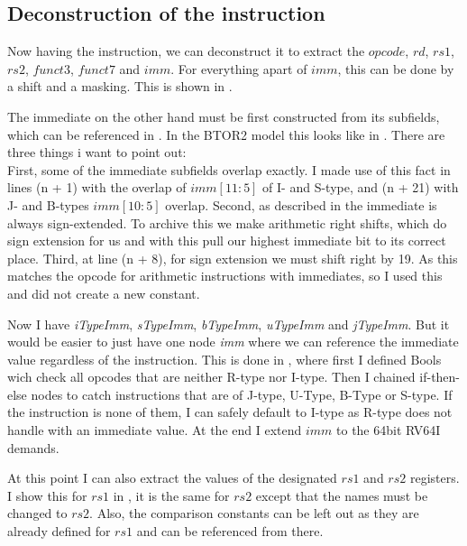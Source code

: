 \subsection{Deconstruction of the instruction}
Now having the instruction, we can deconstruct it to extract the
$opcode$, $rd$, $rs1$, $rs2$, $funct3$, $funct7$ and $imm$. For
everything apart of $imm$, this can be done by a shift and a masking.
This is shown in .

The immediate on the other hand must be first constructed from its
subfields, which can be referenced in . In
the BTOR2 model this looks like in .
 There are three things i
want to point out:\\ First, some of the immediate subfields overlap
exactly. I made use of this fact in lines (n + 1) with the overlap of
$imm[11:5]$ of I- and S-type, and (n + 21) with J- and B-types
$imm[10:5]$ overlap. Second, as described in 
the immediate is always sign-extended. To archive this we make
arithmetic right shifts, which do sign extension for us and with this
pull our highest immediate bit to its correct place. Third, at line
(n + 8), for sign extension we must shift right by 19. As this
matches the opcode for arithmetic instructions with immediates, so I
used this and did not create a new constant.

Now I have \textsl{iTypeImm}, \textsl{sTypeImm}, \textsl{bTypeImm},
\textsl{uTypeImm} and \textsl{jTypeImm}. But it would be easier to
just have one node \textsl{imm} where we can reference the immediate
value regardless of the instruction. This is done in
, where first I defined Bools wich check all
opcodes that are neither R-type nor I-type. Then I chained
if-then-else nodes to catch instructions that are of J-type, U-Type,
B-Type or S-type. If the instruction is none of them, I can safely
default to I-type as R-type does not handle with an immediate value.
At the end I extend $imm$ to the 64bit RV64I demands.

At this point I can also extract the values of the designated $rs1$
and $rs2$ registers. I show this for $rs1$ in
, it is the same for $rs2$ except that the
names must be changed to $rs2$. Also, the comparison constants can be
left out as they are already defined for $rs1$ and can be referenced
from there.







